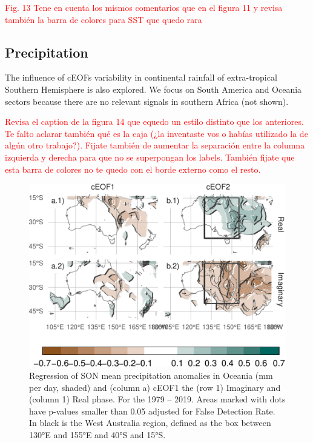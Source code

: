 \documentclass[smallextended]{svjour3}       %
\begin{document}
\textcolor{red}{Fig. 13 Tene en cuenta los mismos comentarios que en el figura 11 y revisa también la barra de colores para SST que quedo rara}

\hypertarget{precipitation}{%
\subsection{Precipitation}\label{precipitation}}

The influence of cEOFs variability in continental rainfall of extra-tropical Southern Hemisphere is also explored.
We focus on South America and Oceania sectors because there are no relevant signals in southern Africa (not shown).



\textcolor{red}{Revisa el caption de la figura 14 que equedo un estilo distinto que los anteriores. Te falto aclarar también qué es la caja (¿la inventaste vos o habías utilizado la de algún otro trabajo?). Fijate también de aumentar la separación entre la columna izquierda y derecha para que no se superpongan los labels. También fijate que esta barra de colores no te quedo con el borde externo como el resto. }

\begin{figure}
\centering
\includegraphics{../figures/pp-oceania-1.pdf}
\caption{\label{fig:pp-oceania}Regression of SON mean precipitation anomalies in Oceania (mm per day, shaded) and (column a) cEOF1 the (row 1) Imaginary and (column 1) Real phase. For the 1979 -- 2019. Areas marked with dots have p-values smaller than 0.05 adjusted for False Detection Rate. In black is the West Australia region, defined as the box between 130°E and 155°E and 40°S and 15°S.}
\end{figure}
\end{document}
